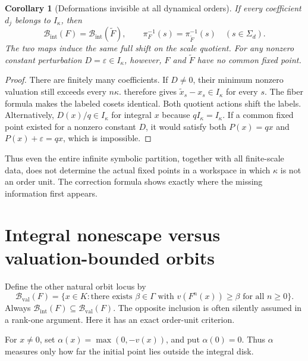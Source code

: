 \documentclass[11pt,a4paper]{article}
\numberwithin{equation}{section}
\theoremstyle{plain}
\newtheorem{corollary}[corollary]{Corollary}
\theoremstyle{definition}
\theoremstyle{remark}
\newcommand{\Ik}{I_\kappa}
\newcommand{\BI}{\mathcal B_{\mathrm{int}}}
\newcommand{\BV}{\mathcal B_{\mathrm{val}}}
\newcommand{\Sig}{\Sigma_d}
\begin{document}
\begin{corollary}[Deformations invisible at all dynamical orders]
\label{epd:cor:flatdeform}
If every coefficient $d_j$ belongs to $\Ik$, then
\[
 \BI(F)=\BI(\widetilde F),\qquad
 \pi_F^{-1}(s)=\pi_{\widetilde F}^{-1}(s)\quad(s\in\Sig).
\]
The two maps induce the same full shift on the scale quotient. For
any nonzero constant perturbation $D=\varepsilon\in\Ik$, however,
$F$ and $\widetilde F$ have no common fixed point.
\end{corollary}
\begin{proof}
There are finitely many coefficients. If $D\ne0$, their minimum
nonzero valuation still exceeds every $n\kappa$.
 therefore gives
$\widetilde x_s-x_s\in\Ik$ for every $s$. The fiber formula makes
the labeled cosets identical. Both quotient actions shift the labels.
Alternatively, $D(x)/q\in\Ik$ for integral $x$ because $q\Ik=\Ik$.
If a common fixed point existed for a nonzero constant $D$, it would
satisfy both $P(x)=qx$ and $P(x)+\varepsilon=qx$, which is impossible.
\end{proof}

Thus even the entire infinite symbolic partition, together with all
finite-scale data, does not determine the actual fixed points in a
workspace in which $\kappa$ is not an order unit. The correction formula shows exactly where the
missing information first appears.

\section{Integral nonescape versus valuation-bounded orbits}
\label{epd:sec:bounded}
Define the other natural orbit locus by
\[
 \BV(F)=\{x\in K:\text{there exists }\beta\in\Gamma
                \text{ with }v(F^n(x))\geq\beta\text{ for all }n\geq0\}.
\]
Always $\BI(F)\subseteq\BV(F)$. The opposite inclusion is often
silently assumed in a rank-one argument. Here it has an exact
order-unit criterion.

For $x\ne0$, set $\alpha(x)=\max(0,-v(x))$, and put $\alpha(0)=0$.
Thus $\alpha$ measures only how far the initial point lies outside
the integral disk.
\end{document}
